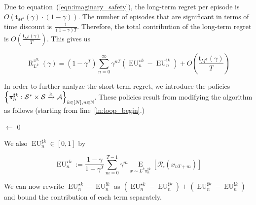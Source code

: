 \documentclass[anon,12pt]{colt2018} %
\newcommand{\AP}[1]{\left(#1\right)}
\newcommand{\AB}[1]{\left[#1\right]}
\newcommand{\AC}[1]{\left\{#1\right\}}
\newcommand{\Ea}[2]{\underset{#1}{\operatorname{E}}\AB{#2}}
\newcommand{\Nats}{\mathbb{N}}
\newcommand{\K}{\xrightarrow{\textnormal{k}}}
\newcommand{\A}{\mathcal{A}}
\newcommand{\St}{\mathcal{S}}
\newcommand{\R}{\mathcal{R}}
\newcommand{\EU}{\operatorname{EU}}
\newcommand{\Rg}{\operatorname{R}}
\newcommand{\MP}[2]{#1#2}
\newcommand{\Tn}{\mathfrak{t}}
\newcommand{\IP}{\pi^{!k}}
\begin{document}
Due to equation~(\ref{eqn:imaginary_safety}), the long-term regret per episode is $O\AP{\Tn_{M^k}(\gamma)\cdot(1-\gamma)}$. The number of episodes that are significant in terms of time discount is $\frac{1}{(1-\gamma)T}$. Therefore, the total contribution of the long-term regret is $O\AP{\frac{\Tn_{M^k}(\gamma)}{T}}$. This gives us

\begin{equation}
\Rg_{L^k}^{\IP}(\gamma) = \AP{1-\gamma^T}\sum_{n=0}^\infty \gamma^{nT}\AP{\EU^{\star k}_n-\EU^{!k}_n}+O\AP{\frac{\Tn_{M^k}(\gamma)}{T}}
\end{equation}

In order to further analyze the short-term regret, we introduce the policies\\$\AC{\pi_n^{\sharp k}: \St^* \times \St \K \A}_{k \in [N],n \in \Nats}$. These policies result from modifying the algorithm as follows (starting from line~\ref{ln:loop_begin}.)

\begin{algorithm}[h]

\setcounter{AlgoLine}{2}


\Counter$\leftarrow$ 0\;


\end{algorithm}

We also $\EU^{\sharp k}_n\in[0,1]$ by

\begin{equation}
\EU_n^{\star k}:=\frac{1-\gamma}{1-\gamma^T}\sum_{m=0}^{T-1} \gamma^m \Ea{x\sim{\MP{L^k}{\pi_n^{\sharp  k}}}}{\R_\square\AP{x_{nT+m}}}
\end{equation}

We can now rewrite $\EU^{\star k}_n-\EU^{!k}_n$ as $\AP{\EU^{\star k}_n-\EU^{\sharp k}_n}+\AP{\EU^{\sharp k}_n-\EU^{!k}_n}$ and bound the contribution of each term separately.
\end{document}
